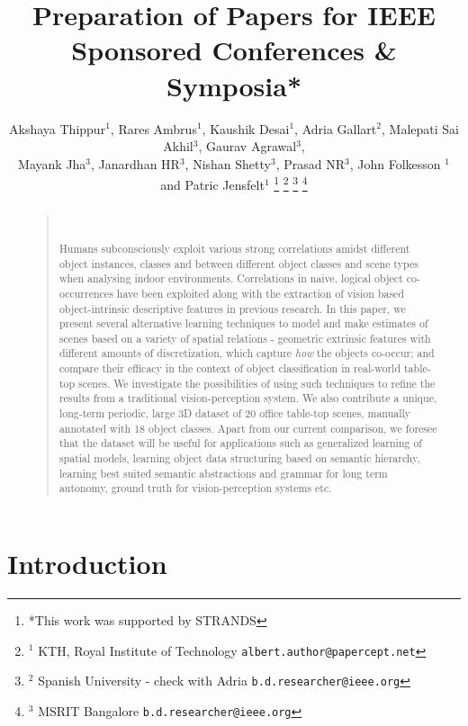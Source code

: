 \documentclass[letterpaper, 10 pt, conference]{ieeeconf}  %
\title{\LARGE \bf
Preparation of Papers for IEEE Sponsored Conferences \& Symposia*
}
\author{Akshaya Thippur$^{1}$, Rares Ambrus$^{1}$, Kaushik Desai$^{1}$, Adria Gallart$^{2}$, Malepati Sai Akhil$^{3}$, Gaurav Agrawal$^{3}$,\\Mayank Jha$^{3}$, Janardhan HR$^{3}$, Nishan Shetty$^{3}$, Prasad NR$^{3}$, John Folkesson $^{1}$ and Patric Jensfelt$^{1}$%
\thanks{*This work was supported by STRANDS}%
\thanks{$^{1}$ KTH, Royal Institute of Technology
        {\tt\small albert.author@papercept.net}}%
\thanks{$^{2}$ Spanish University - check with Adria
        {\tt\small b.d.researcher@ieee.org}}%
\thanks{$^{3}$ MSRIT Bangalore
        {\tt\small b.d.researcher@ieee.org}}%
}
\begin{document}
\maketitle
\thispagestyle{empty}
\pagestyle{empty}


\begin{abstract}
\begin{quote}\

Humans subconsciously exploit various strong correlations amidst different object instances, classes and between different object classes and scene types when analysing indoor environments. Correlations in naive, logical object co-occurrences have been exploited along with the extraction of vision based object-intrinsic descriptive features in previous research. In this paper, we present several alternative learning techniques to model and make estimates of scenes based on a variety of spatial relations - geometric extrinsic features with different amounts of discretization, which capture \textit{how} the objects co-occur; and compare their efficacy in the context of object classification in real-world table-top scenes. We investigate the possibilities of using such techniques to refine the results from a traditional vision-perception system. We also contribute a unique, long-term periodic, large 3D dataset of 20 office table-top scenes, manually annotated with 18 object classes. Apart from our current comparison, we foresee that the dataset will be useful for applications such as generalized learning of spatial models, learning object data structuring based on semantic hierarchy, learning best suited semantic abstractions and grammar for long term autonomy, ground truth for vision-perception systems etc.
\end{quote}
\end{abstract}


\section{Introduction}
\label{sec:Introduction}
\end{document}

